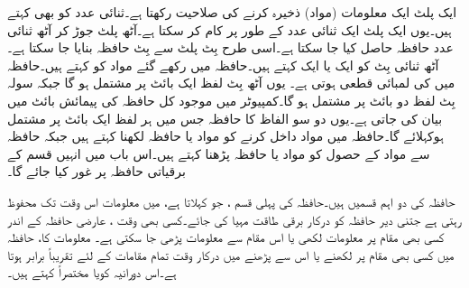 ایک پلٹ ایک معلومات (مواد)  ذخیرہ کرنے کی صلاحیت رکھتا ہے۔ثنائی عدد کو   بھی  کہتے ہیں۔یوں ایک پلٹ ایک ثنائی عدد   کے طور  پر کام کر سکتا ہے۔آٹھ پلٹ جوڑ کر آٹھ ثنائی عدد حافظہ حاصل کیا جا سکتا ہے۔اسی طرح    بِٹ پلٹ سے     بِٹ حافظہ بنایا جا سکتا ہے۔آٹھ ثنائی  بِٹ کو ایک  یا ایک  کہتے ہیں۔حافظہ میں رکھے  گئے   مواد کو کہتے ہیں۔حافظہ میں  کی لمبائی قطعی ہوتی ہے۔ یوں آٹھ بِٹ لفظ ایک بائٹ پر مشتمل ہو گا جبکہ سولہ بِٹ لفظ دو بائٹ پر مشتمل ہو گا۔کمپیوٹر میں موجود کل  حافظہ کی  پیمائش  بائٹ میں بیان کی جاتی ہے۔یوں  دو سو الفاظ کا حافظہ  جس میں ہر لفظ ایک بائٹ پر مشتمل ہوکہلائے گا۔حافظہ میں مواد داخل کرنے کو مواد یا حافظہ لکھنا کہتے ہیں جبکہ  حافظہ  سے مواد کے حصول کو مواد   یا   حافظہ پڑھنا کہتے ہیں۔اس باب میں انہیں قسم کے  برقیاتی  حافظہ پر غور کیا جائے گا۔


حافظہ کی دو اہم  قسمیں ہیں۔حافظہ کی پہلی قسم ، جو  کہلاتا ہے، میں معلومات اس وقت تک محفوظ رہتی ہے جتنی دیر حافظہ کو درکار برقی طاقت مہیا کی جائے۔کسی بھی وقت   ،  عارضی حافظہ کے اندر  کسی بھی   مقام پر  معلومات   لکھی  یا اس مقام سے  معلومات پڑھی جا سکتی ہے۔ معلومات کا، حافظہ میں کسی بھی مقام پر لکھنے یا اس سے پڑھنے میں درکار وقت تمام  مقامات کے لئے تقریباً برابر ہوتا ہے۔اس دورانیہ کویا  مختصراً   کہتے ہیں۔


